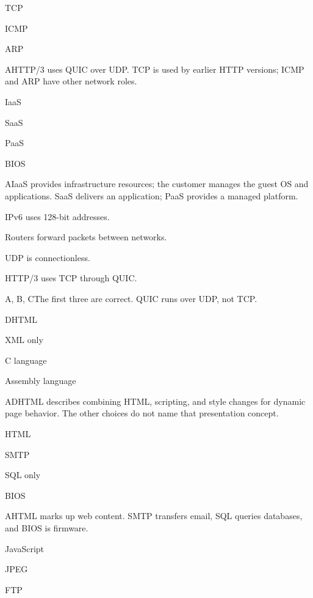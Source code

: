 \begin{enumerate}[label=\textbf{Q\arabic*.}, leftmargin=*]
{   \item TCP
   \item ICMP
   \item ARP}
  {A}{HTTP/3 uses QUIC over UDP. TCP is used by earlier HTTP versions; ICMP and ARP have other network roles.}
  {\item IaaS
   \item SaaS
   \item PaaS
   \item BIOS}
  {A}{IaaS provides infrastructure resources; the customer manages the guest OS and applications. SaaS delivers an application; PaaS provides a managed platform.}
  {\item IPv6 uses 128-bit addresses.
   \item Routers forward packets between networks.
   \item UDP is connectionless.
   \item HTTP/3 uses TCP through QUIC.}
  {A, B, C}{The first three are correct. QUIC runs over UDP, not TCP.}
\fi
\ifnum{}
  {\item DHTML
   \item XML only
   \item C language
   \item Assembly language}
  {A}{DHTML describes combining HTML, scripting, and style changes for dynamic page behavior. The other choices do not name that presentation concept.}
  {\item HTML
   \item SMTP
   \item SQL only
   \item BIOS}
  {A}{HTML marks up web content. SMTP transfers email, SQL queries databases, and BIOS is firmware.}
  {\item JavaScript
   \item JPEG
   \item FTP
}
\end{enumerate}
